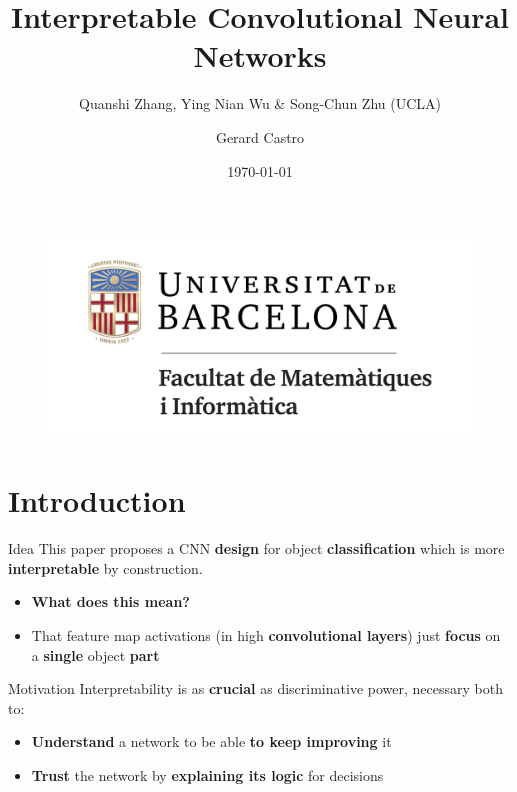 \documentclass{beamer}
\title{Interpretable Convolutional Neural Networks}
\subtitle{Quanshi Zhang, Ying Nian Wu \& Song-Chun Zhu (UCLA)}
\institute{%
Universitat de Barcelona}
\author{Gerard Castro}
\date{\today}
\begin{document}
\begin{frame}
    \titlepage
    \begin{figure}[htpb]
        \begin{center}
           \includegraphics[width=0.4\linewidth]{img/fmiub.png}
        \end{center}
    \end{figure}
\end{frame}


\section{Introduction}

\begin{frame}{Idea}
    This paper proposes a CNN \textbf{design} for object \textbf{classification} which is more \textbf{interpretable} by construction.
    \begin{itemize}[<+->]  
        \item \textbf{What does this mean?} 
        \item  That feature map activations (in high \textbf{convolutional layers}) just \textbf{focus} on a \textbf{single} object \textbf{part}
    \end{itemize}
\end{frame}

\begin{frame}{Motivation}
	Interpretability is as \textbf{crucial} as discriminative power, necessary both to:
	\begin{itemize}[<+->]
        \item  \textbf{Understand} a network to be able \textbf{to keep improving} it
        \item \textbf{Trust} the network by \textbf{explaining its logic} for decisions %
    \end{itemize}
\end{frame}
\end{document}
